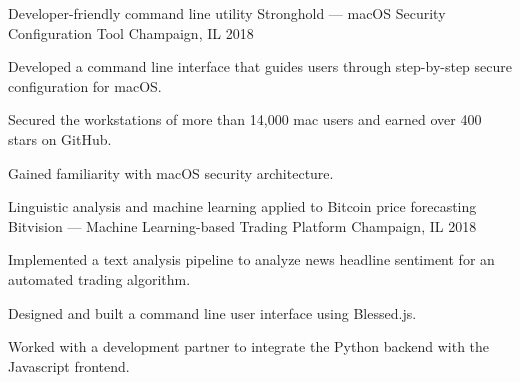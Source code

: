 

\begin{cventries}
\cventry
{Developer-friendly command line utility} %
{Stronghold — macOS Security Configuration Tool} %
{Champaign, IL} %
{2018} %
{
	\begin{cvitems} %
		\item {Developed a command line interface that guides users through step-by-step secure configuration for macOS.}
		\item {Secured the workstations of more than 14,000 mac users and earned over 400 stars on GitHub.}
		\item{Gained familiarity with macOS security architecture.} 
	\end{cvitems}
}
\cventry
{Linguistic analysis and machine learning applied to Bitcoin price forecasting} %
{Bitvision — Machine Learning-based Trading Platform} %
{Champaign, IL} %
{2018} %
{
	\begin{cvitems} %
		\item {Implemented a text analysis pipeline to analyze news headline sentiment for an automated trading algorithm.}
		\item {Designed and built a command line user interface using Blessed.js.}
		\item {Worked with a development partner to integrate the Python backend with the Javascript frontend.}
	\end{cvitems}
}


\end{cventries}
